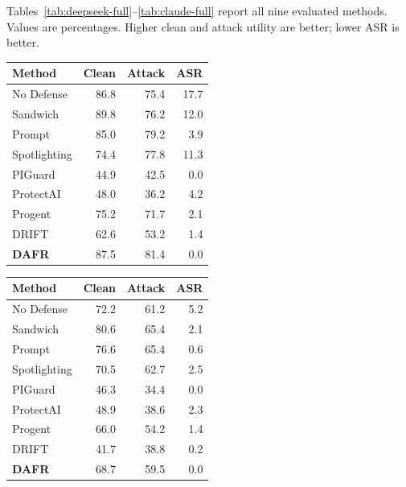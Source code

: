 \documentclass[letterpaper]{article}
\begin{document}
Tables~\ref{tab:deepseek-full}--\ref{tab:claude-full} report all nine evaluated methods. Values are percentages. Higher clean and attack utility are better; lower ASR is better.

\begin{center}
\small
\begin{tabular}{lrrr}
\toprule
Method & Clean & Attack & ASR\\
\midrule
No Defense & 86.8 & 75.4 & 17.7\\
Sandwich & 89.8 & 76.2 & 12.0\\
Prompt & 85.0 & 79.2 & 3.9\\
Spotlighting & 74.4 & 77.8 & 11.3\\
PIGuard & 44.9 & 42.5 & 0.0\\
ProtectAI & 48.0 & 36.2 & 4.2\\
Progent & 75.2 & 71.7 & 2.1\\
DRIFT & 62.6 & 53.2 & 1.4\\
\textbf{DAFR} & 87.5 & 81.4 & 0.0\\
\bottomrule
\end{tabular}
\label{tab:deepseek-full}
\end{center}

\begin{center}
\small
\begin{tabular}{lrrr}
\toprule
Method & Clean & Attack & ASR\\
\midrule
No Defense & 72.2 & 61.2 & 5.2\\
Sandwich & 80.6 & 65.4 & 2.1\\
Prompt & 76.6 & 65.4 & 0.6\\
Spotlighting & 70.5 & 62.7 & 2.5\\
PIGuard & 46.3 & 34.4 & 0.0\\
ProtectAI & 48.9 & 38.6 & 2.3\\
Progent & 66.0 & 54.2 & 1.4\\
DRIFT & 41.7 & 38.8 & 0.2\\
\textbf{DAFR} & 68.7 & 59.5 & 0.0\\
\bottomrule
\end{tabular}
\label{tab:gpt-full}
\end{center}
\end{document}
